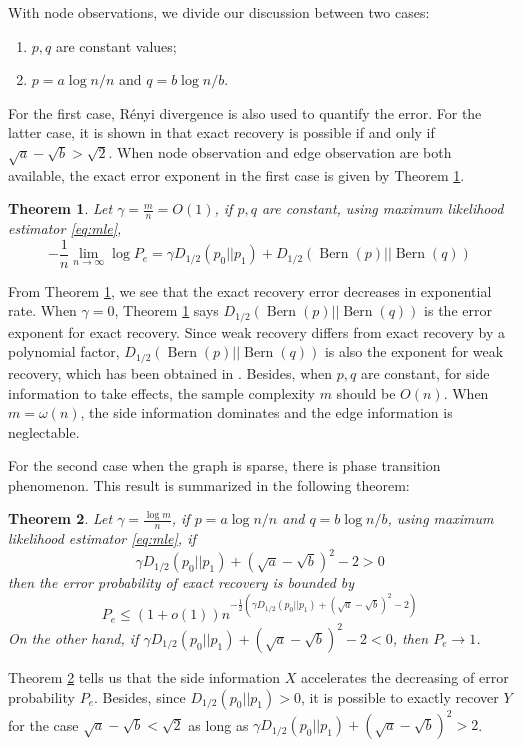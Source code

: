 \documentclass[conference]{IEEEtran}
\newtheorem{theorem}{Theorem}
\DeclareMathOperator{\Bern}{Bern}
\begin{document}
With node observations, we divide our discussion between two cases:
\begin{enumerate}
\item $p,q$ are constant values;
\item $p = a \log n /n$ and $q = b \log n / b$.
\end{enumerate}
For the first case, Rényi divergence is also used to quantify the error.
For the latter case, it is shown in \cite{abbe2015exact}
that exact recovery is possible if and only if $\sqrt{a} - \sqrt{b} > \sqrt{2}$.
When node observation and edge observation are both available, the exact error exponent in the first case is given by Theorem \ref{thm:constant}.
\begin{theorem}\label{thm:constant}
	Let $\gamma = \frac{m}{n} = O(1)$, if $p,q$ are constant, using maximum likelihood estimator \eqref{eq:mle},
	\begin{equation}
	-\frac{1}{n}\lim_{n\to \infty} \log P_e =  \gamma D_{1/2}(p_0 || p_1) + D_{1/2}(\Bern(p)||\Bern(q))
	\end{equation} 
\end{theorem}
From Theorem \ref{thm:constant}, we see that the exact recovery error decreases in exponential rate.
When $\gamma=0$, Theorem \ref{thm:constant} says $D_{1/2}(\Bern(p)||\Bern(q))$
is the error exponent for exact recovery. Since weak recovery differs from exact recovery by a polynomial factor, $D_{1/2}(\Bern(p)||\Bern(q))$ is also the exponent for weak recovery, which has been obtained
in \cite{zhang2016}. Besides, when $p,q$ are constant, for side information to take effects, the sample complexity $m$ should be $O(n)$. When $m=\omega(n)$, the side information dominates and the edge information is neglectable.

For the second case when the graph is sparse, there is phase transition phenomenon. This result
is summarized
in the following theorem:
\begin{theorem}\label{thm:Pe}
Let $\gamma = \frac{\log m}{n}$, if $p = a \log n /n$ and $q = b \log n / b$, using maximum likelihood estimator \eqref{eq:mle},
if
\begin{equation}\label{eq:positive_condition}
\gamma D_{1/2}(p_0||p_1) + (\sqrt{a} - \sqrt{b})^2-2 > 0
\end{equation}
then the error probability
of exact recovery is bounded by
\begin{equation}\label{eq:PeMain}
    P_e \leq (1+o(1)) n^{-\frac{1}{2}\left(\gamma D_{1/2}(p_0||p_1) + (\sqrt{a} - \sqrt{b})^2-2\right)}
\end{equation}
On the other hand, if $\gamma D_{1/2}(p_0||p_1) + (\sqrt{a} - \sqrt{b})^2-2 < 0$,
then $P_e \to 1$.
\end{theorem}
Theorem \ref{thm:Pe} tells us that the side information $X$ accelerates the
decreasing of error probability $P_e$. Besides, since 
$D_{1/2}(p_0||p_1) > 0$, it is possible to exactly recover $Y$
for the case $\sqrt{a} - \sqrt{b} < \sqrt{2}$ as long as $\gamma D_{1/2}(p_0||p_1) + (\sqrt{a} - \sqrt{b})^2 > 2$.
\end{document}
